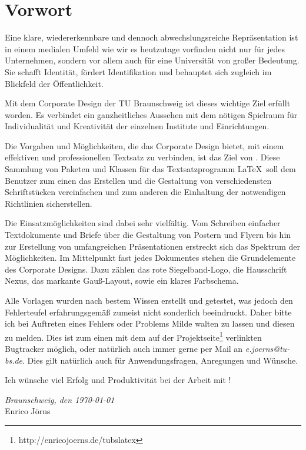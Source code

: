 \chapter*{Vorwort}

Eine klare, wiedererkennbare und dennoch abwechslungsreiche
Repräsentation ist in einem medialen Umfeld wie wir es heutzutage
vorfinden nicht nur für jedes Unternehmen, sondern vor allem auch
für eine Universität von großer Bedeutung.
Sie schafft Identität, fördert Identifikation und behauptet sich zugleich im 
Blickfeld der Öffentlichkeit.

Mit dem Corporate Design der TU Braunschweig ist dieses wichtige Ziel
erfüllt worden. Es verbindet ein ganzheitliches Aussehen mit dem nötigen
Spielraum für Individualität und Kreativität der einzelnen Institute und 
Einrichtungen.\bigskip


Die Vorgaben und Möglichkeiten, die das Corporate Design bietet,
mit einem effektiven und professionellen Textsatz zu verbinden, ist
das Ziel von \tubslatex. Diese Sammlung von Paketen und Klassen
für das Textsatzprogramm \LaTeX\ soll dem Benutzer zum einen das Erstellen und
die Gestaltung von verschiedensten Schriftstücken vereinfachen und zum anderen
die Einhaltung der notwendigen Richtlinien sicherstellen.

Die Einsatzmöglichkeiten sind dabei sehr vielfältig.
Vom Schreiben einfacher Textdokumente und Briefe über die Gestaltung von Postern
und Flyern bis hin zur Erstellung von umfangreichen Präsentationen erstreckt
sich das Spektrum der Möglichkeiten.
Im Mittelpunkt fast jedes Dokumentes stehen die Grundelemente des Corporate
Designs. Dazu zählen das rote Siegelband-Logo, die Hausschrift Nexus,
das markante Gauß-Layout, sowie ein klares Farbschema.\bigskip


Alle Vorlagen wurden nach bestem Wissen erstellt und getestet, was
jedoch den Fehlerteufel erfahrungsgemäß zumeist nicht sonderlich beeindruckt.
Daher bitte ich bei Auftreten eines Fehlers oder Problems Milde walten
zu lassen und diesen zu melden.
Dies ist zum einen mit dem auf der Projektseite\footnote{http://enricojoerns.de/tubslatex}
verlinkten Bugtracker möglich,
oder natürlich auch immer gerne per Mail an \textit{e.joerns@tu-bs.de}.
Dies gilt natürlich auch für Anwendungsfragen, Anregungen und Wünsche.

Ich wünsche viel Erfolg und Produktivität bei der Arbeit mit \tubslatex!

\hfill\textit{Braunschweig, den \today}\\[\bigskipamount]
\noindent Enrico Jörns

